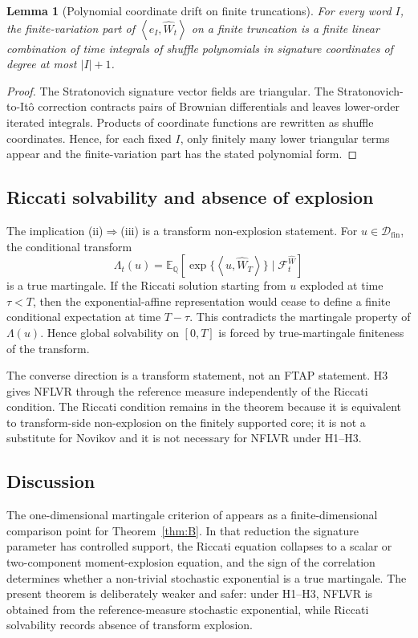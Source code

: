\documentclass[11pt,oneside]{article}
\theoremstyle{plain}
\newtheorem{lemma}[theorem]{Lemma}
\theoremstyle{definition}
\theoremstyle{remark}
\newcommand{\E}{\mathbb{E}}
\newcommand{\Q}{\mathbb{Q}}
\newcommand{\cW}{\widehat W}
\newcommand{\FWh}{\mathcal F^{\widehat W}}
\newcommand{\inner}[2]{\left\langle #1,#2\right\rangle}
\begin{document}
\begin{lemma}[Polynomial coordinate drift on finite truncations]
\label{lem:polynomial-coordinate-drift}
For every word $I$, the finite-variation part of $\inner{e_I}{\cW_t}$ on a finite truncation is a finite linear combination of time integrals of shuffle polynomials in signature coordinates of degree at most $|I|+1$.
\end{lemma}

\begin{proof}
The Stratonovich signature vector fields are triangular. The Stratonovich-to-It\^o correction contracts pairs of Brownian differentials and leaves lower-order iterated integrals. Products of coordinate functions are rewritten as shuffle coordinates. Hence, for each fixed $I$, only finitely many lower triangular terms appear and the finite-variation part has the stated polynomial form.
\end{proof}

\subsection{Riccati solvability and absence of explosion}
\label{subsec:riccati-solvability-absence-explosion}
The implication (ii)$\Rightarrow$(iii) is a transform non-explosion statement. For $u\in\mathcal D_{\mathrm{fin}}$, the conditional transform
\[
\Lambda_t(u)=\E_\Q[\exp\{\inner{u}{\cW_T}\}\mid\FWh_t]
\]
is a true martingale. If the Riccati solution starting from $u$ exploded at time $\tau<T$, then the exponential-affine representation would cease to define a finite conditional expectation at time $T-\tau$. This contradicts the martingale property of $\Lambda(u)$. Hence global solvability on $[0,T]$ is forced by true-martingale finiteness of the transform.

The converse direction is a transform statement, not an FTAP statement. H3 gives NFLVR through the reference measure independently of the Riccati condition. The Riccati condition remains in the theorem because it is equivalent to transform-side non-explosion on the finitely supported core; it is not a substitute for Novikov and it is not necessary for NFLVR under H1--H3.

\subsection{Discussion}

The one-dimensional martingale criterion of \citet{AbiJaberGassiatSotnikov2025} appears as a finite-dimensional comparison point for Theorem~\ref{thm:B}. In that reduction the signature parameter has controlled support, the Riccati equation collapses to a scalar or two-component moment-explosion equation, and the sign of the correlation determines whether a non-trivial stochastic exponential is a true martingale. The present theorem is deliberately weaker and safer: under H1--H3, NFLVR is obtained from the reference-measure stochastic exponential, while Riccati solvability records absence of transform explosion.
\end{document}
